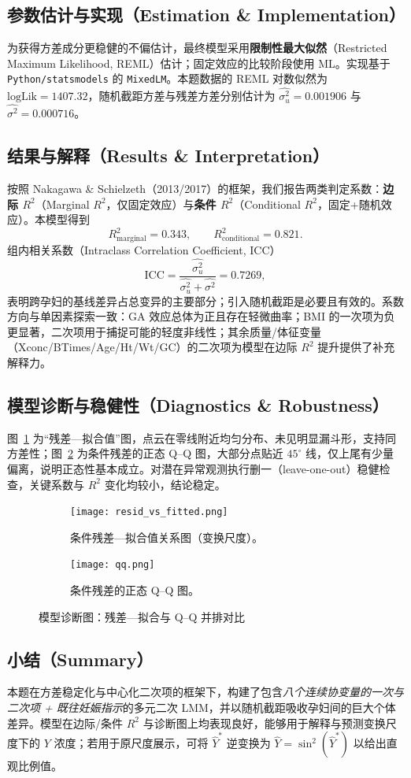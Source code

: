 \documentclass[12pt,a4paper]{ctexart}
\numberwithin{equation}{section}
\theoremstyle{mcm}
\begin{document}
{\subsection{参数估计与实现（Estimation \& Implementation）}
为获得方差成分更稳健的不偏估计，最终模型采用\textbf{限制性最大似然}（Restricted Maximum Likelihood, REML）估计；固定效应的比较阶段使用 ML。实现基于 \texttt{Python/statsmodels} 的 \texttt{MixedLM}。本题数据的 REML 对数似然为
\(\text{logLik}=1407.32\)，随机截距方差与残差方差分别估计为
\(\widehat{\sigma_u^2}=0.001906\) 与 \(\widehat{\sigma^2}=0.000716\)。

\subsection{结果与解释（Results \& Interpretation）}
按照 Nakagawa \& Schielzeth（2013/2017）的框架，我们报告两类判定系数：\textbf{边际 \(R^2\)}（Marginal \(R^2\)，仅固定效应）与\textbf{条件 \(R^2\)}（Conditional \(R^2\)，固定+随机效应）。本模型得到
\[
R^2_\text{marginal}=0.343,\qquad
R^2_\text{conditional}=0.821.
\]
组内相关系数（Intraclass Correlation Coefficient, ICC）
\[
\mathrm{ICC}=\frac{\widehat{\sigma_u^2}}{\widehat{\sigma_u^2}+\widehat{\sigma^2}}
=0.7269,
\]
表明跨孕妇的基线差异占总变异的主要部分；引入随机截距是必要且有效的。系数方向与单因素探索一致：GA 效应总体为正且存在轻微曲率；BMI 的一次项为负更显著，二次项用于捕捉可能的轻度非线性；其余质量/体征变量（Xconc/BTimes/Age/Ht/Wt/GC）的二次项为模型在边际 \(R^2\) 提升提供了补充解释力。

\subsection{模型诊断与稳健性（Diagnostics \& Robustness）}
图~\ref{fig:residfit} 为“残差—拟合值”图，点云在零线附近均匀分布、未见明显漏斗形，支持同方差性；图~\ref{fig:qqplot} 为条件残差的正态 Q--Q 图，大部分点贴近 $45^\circ$ 线，仅上尾有少量偏离，说明正态性基本成立。对潜在异常观测执行删一（leave-one-out）稳健检查，关键系数与 \(R^2\) 变化均较小，结论稳定。

\begin{figure}[H]\centering
  \begin{subfigure}[t]{.48\linewidth}
    \texttt{[image: resid\_vs\_fitted.png]}
    \caption{条件残差—拟合值关系图（变换尺度）。}
    \label{fig:residfit}
  \end{subfigure}\hfill%
  \begin{subfigure}[t]{.48\linewidth}
    \texttt{[image: qq.png]}
    \caption{条件残差的正态 Q--Q 图。}
    \label{fig:qqplot}
  \end{subfigure}
  \caption{模型诊断图：残差—拟合与 Q--Q 并排对比}
  \label{fig:q1_diag_pair}
\end{figure}


\subsection{小结（Summary）}
本题在方差稳定化与中心化二次项的框架下，构建了包含\emph{八个连续协变量的一次与二次项 + 既往妊娠指示}的多元二次 LMM，并以随机截距吸收孕妇间的巨大个体差异。模型在边际/条件 \(R^2\) 与诊断图上均表现良好，能够用于解释与预测变换尺度下的 \(Y\) 浓度；若用于原尺度展示，可将 \(\hat Y^{*}\) 逆变换为 \(\hat Y=\sin^2(\hat Y^{*})\) 以给出直观比例值。
\endgroup}
\end{document}
